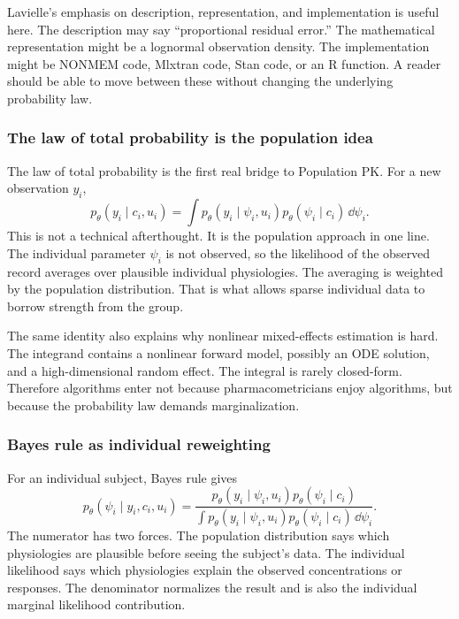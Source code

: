 Lavielle's emphasis on description, representation, and implementation is useful here.  The description may say ``proportional residual error.''  The mathematical representation might be a lognormal observation density.  The implementation might be NONMEM code, Mlxtran code, Stan code, or an R function.  A reader should be able to move between these without changing the underlying probability law.

\subsubsection*{The law of total probability is the population idea}

The law of total probability is the first real bridge to Population PK.  For a new observation \(y_i\),
\[
  p_\theta(y_i\mid c_i,u_i)
  =
  \int p_\theta(y_i\mid \psi_i,u_i)
       p_\theta(\psi_i\mid c_i)\,\dd \psi_i.
\]
This is not a technical afterthought.  It is the population approach in one line.  The individual parameter \(\psi_i\) is not observed, so the likelihood of the observed record averages over plausible individual physiologies.  The averaging is weighted by the population distribution.  That is what allows sparse individual data to borrow strength from the group.

The same identity also explains why nonlinear mixed-effects estimation is hard.  The integrand contains a nonlinear forward model, possibly an ODE solution, and a high-dimensional random effect.  The integral is rarely closed-form.  Therefore algorithms enter not because pharmacometricians enjoy algorithms, but because the probability law demands marginalization.

\subsubsection*{Bayes rule as individual reweighting}

For an individual subject, Bayes rule gives
\[
  p_\theta(\psi_i\mid y_i,c_i,u_i)
  =
  \frac{
    p_\theta(y_i\mid \psi_i,u_i)p_\theta(\psi_i\mid c_i)
  }{
    \int p_\theta(y_i\mid \psi_i,u_i)p_\theta(\psi_i\mid c_i)\,\dd\psi_i
  }.
\]
The numerator has two forces.  The population distribution says which physiologies are plausible before seeing the subject's data.  The individual likelihood says which physiologies explain the observed concentrations or responses.  The denominator normalizes the result and is also the individual marginal likelihood contribution.

